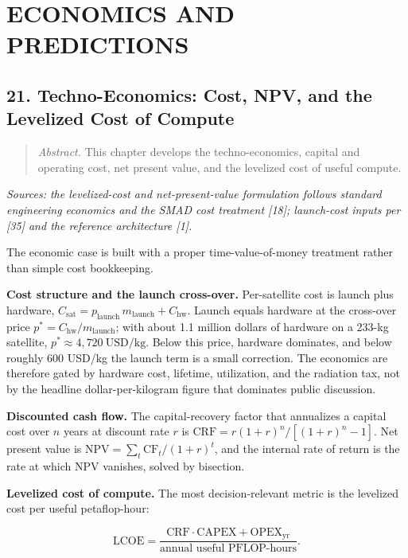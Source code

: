 \documentclass[
  11pt,
  openany,
  oneside]{book}
\begin{document}
\part{ECONOMICS AND PREDICTIONS}\label{economics-and-predictions}

\chapter{21. Techno-Economics: Cost, NPV, and the Levelized Cost of
Compute}\label{techno-economics-cost-npv-and-the-levelized-cost-of-compute}

\begin{quote}
\emph{Abstract.} This chapter develops the techno-economics, capital and
operating cost, net present value, and the levelized cost of useful
compute.
\end{quote}

\emph{Sources: the levelized-cost and net-present-value formulation
follows standard engineering economics and the SMAD cost treatment
{[}18{]}; launch-cost inputs per {[}35{]} and the reference architecture
{[}1{]}.}

The economic case is built with a proper time-value-of-money treatment
rather than simple cost bookkeeping.

\textbf{Cost structure and the launch cross-over.} Per-satellite cost is
launch plus hardware,
\(C_{\mathrm{sat}} = p_{\mathrm{launch}}\, m_{\mathrm{launch}} + C_{\mathrm{hw}}\).
Launch equals hardware at the cross-over price
\(p^{*} = C_{\mathrm{hw}}/m_{\mathrm{launch}}\); with about 1.1 million
dollars of hardware on a 233-kg satellite,
\(p^{*} \approx 4{,}720\ \mathrm{USD/kg}\). Below this price, hardware
dominates, and below roughly 600 USD/kg the launch term is a small
correction. The economics are therefore gated by hardware cost,
lifetime, utilization, and the radiation tax, not by the headline
dollar-per-kilogram figure that dominates public discussion.

\textbf{Discounted cash flow.} The capital-recovery factor that
annualizes a capital cost over \(n\) years at discount rate \(r\) is
\(\mathrm{CRF} = r(1+r)^n/[(1+r)^n - 1]\). Net present value is
\(\mathrm{NPV} = \sum_t \mathrm{CF}_t/(1+r)^t\), and the internal rate
of return is the rate at which NPV vanishes, solved by bisection.

\textbf{Levelized cost of compute.} The most decision-relevant metric is
the levelized cost per useful petaflop-hour:

\begin{equation}
\mathrm{LCOE} = \frac{\mathrm{CRF}\cdot \mathrm{CAPEX} + \mathrm{OPEX}_{\mathrm{yr}}}
{\text{annual useful PFLOP-hours}}. \tag{21.1}
\end{equation}
\end{document}

